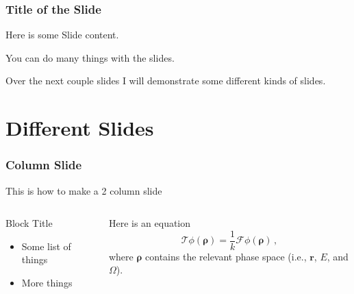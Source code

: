\documentclass[fleqn]{beamer}
\begin{document}
    \begin{frame}
        \frametitle{Title of the Slide}
        Here is some Slide content.
        
        You can do many things with the slides.
        
        Over the next couple slides I will demonstrate some different kinds of slides.
    \end{frame}
    
    \section{Different Slides} %
    \begin{frame}
        \frametitle{Column Slide}
        This is how to make a 2 column slide
        \begin{columns}[c]
            \begin{column}{0.5\textwidth} %
                \begin{block}{Block Title}
                    \begin{itemize}
                        \item Some list of things
                        \item More things
                    \end{itemize}
                \end{block}
            \end{column}
            
            \begin{column}{0.5\textwidth} %
                Here is an equation
                \begin{equation}
                    \mathcal{T} \phi(\bm{\rho}) = \frac{1}{k} \mathcal{F} \phi(\bm{\rho}) \, , \nonumber
                \end{equation}
                where $\bm{\rho}$ contains the relevant phase space (i.e., $\mathbf{r}$, $E$, and $\Omega$).
            \end{column}
        \end{columns}
    \end{frame}
    
\end{document}
